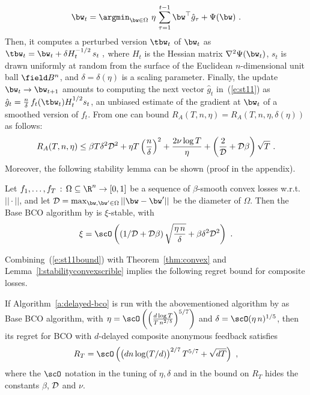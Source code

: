 %
\begin{equation}\label{e:st11}
\bw_t = \argmin_{\bw\in \Omega}\ \eta\,\sum_{\tau = 1}^{t-1} \bw^\top{\hat g_{\tau}} + \Psi(\bw)~.
\end{equation}
%
Then, it computes a perturbed version $\tbw_t$ of $\bw_t$ as 
\(
\tbw_t = \bw_t + \delta H_t^{-1/2}\,s_t~,
\)
where $H_t$ is the Hessian matrix $\nabla^2 \Psi(\bw_t)$, $s_t$ is drawn uniformly at random from the surface of the Euclidean $n$-dimensional unit ball $\B^n$, and $\delta = \delta(\eta)$ is a scaling parameter. Finally, the update $\bw_t \rightarrow \bw_{t+1}$ amounts to computing the next vector ${\hat g_{t}}$ in~(\ref{e:st11}) as ${\hat g_{t}} = \frac{n}{\delta}\,f_t(\tbw_t)H_t^{1/2}s_t$,
an unbiased estimate of the gradient at $\bw_t$ of a smoothed version 
of $f_t$.
From \citep{st11} one can bound $R_A(T,n,\eta) = R_A(T,n,\eta,\delta(\eta))$ as follows:
%
\begin{equation}\label{e:st11bound}
R_A(T,n,\eta) \leq \beta T\delta^2\mathcal{D}^2 + \eta T\left(\frac{n}{\delta}\right)^2 + \frac{2\nu\log T}{\eta} + \left(\frac{2}{\mathcal{D}} + \mathcal{D}\beta\right)\sqrt{T}~.
\end{equation}
%
Moreover, the following stability lemma can be shown (proof in the appendix).
%
\begin{lemma}\label{l:stabilityconvexscrible}
Let $f_1,\ldots,f_T\,:\,\Omega \subseteq \R^n \rightarrow [0, 1]$ be a sequence of $\beta$-smooth convex losses w.r.t. $||\cdot||$, and let $\scD = \max_{\bw,\bw'\in \Omega} ||\bw-\bw'||$ be the diameter of $\Omega$. Then the Base BCO algorithm by \cite{st11} is $\xi$-stable, with 
\[
\xi = \scO\left(\left(1/\scD + \scD\beta\right)\sqrt{\frac{\eta\,n}{\delta}}  + \beta\delta^2\scD^2\right)~.
\]
\end{lemma}
%
Combining~(\ref{e:st11bound}) with Theorem~\ref{thm:convex} and Lemma~\ref{l:stabilityconvexscrible} implies the following regret bound for composite losses.
%
\begin{corollary}\label{c:st11}
If Algorithm~\ref{a:delayed-bco} is run with the abovementioned algorithm by \citet{st11} as Base BCO algorithm, with $\eta = \scO\left(\left(\frac{d\log T}{T\,n^{2/5}}\right)^{5/7}\right)$ and $\delta = \scO(\eta\,n)^{1/5}$, then its regret for BCO with $d$-delayed composite anonymous feedback satisfies
\[
R_T = \scO\left(\bigl(dn\log (T/d)\bigl)^{2/7}\,T^{5/7} + \sqrt{dT}\right)~,
\]
where the $\scO$ notation in the tuning of $\eta,\delta$ and in the bound on $R_T$ hides the constants $\beta$, $\mathcal{D}$ and $\nu$.
\end{corollary}
